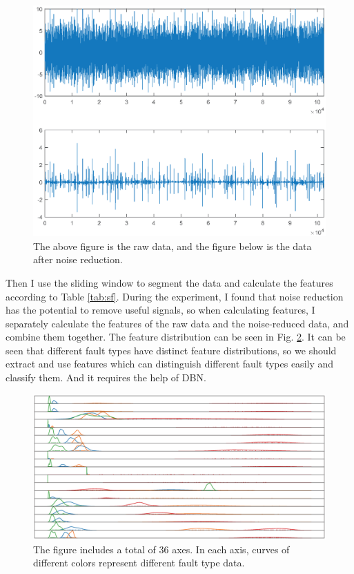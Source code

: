 \documentclass{bioinfo}
\begin{document}
\begin{figure}[htbp]
	\centering
	\includegraphics[width=\columnwidth]{pre.eps}
	\caption{The above figure is the raw data, and the figure below is the data after noise reduction.}
	\label{fig:pre}
\end{figure}

Then I use the sliding window to segment the data and calculate the features according to Table \ref{tab:sf}. During the experiment, I found that noise reduction has the potential to remove useful signals, so when calculating features, I separately calculate the features of the raw data and the noise-reduced data, and combine them together. The feature distribution can be seen in Fig. \ref{fig:feature}. It can be seen that different fault types have distinct feature distributions, so we should extract and use features which can distinguish different fault types easily and classify them. And it requires the help of DBN.

\begin{figure}[htbp]
	\centering
	\includegraphics[width=\columnwidth]{feature.eps}
	\caption{The figure includes a total of 36 axes. In each axis, curves of different colors represent different fault type data.}
	\label{fig:feature}
\end{figure}
\end{document}
